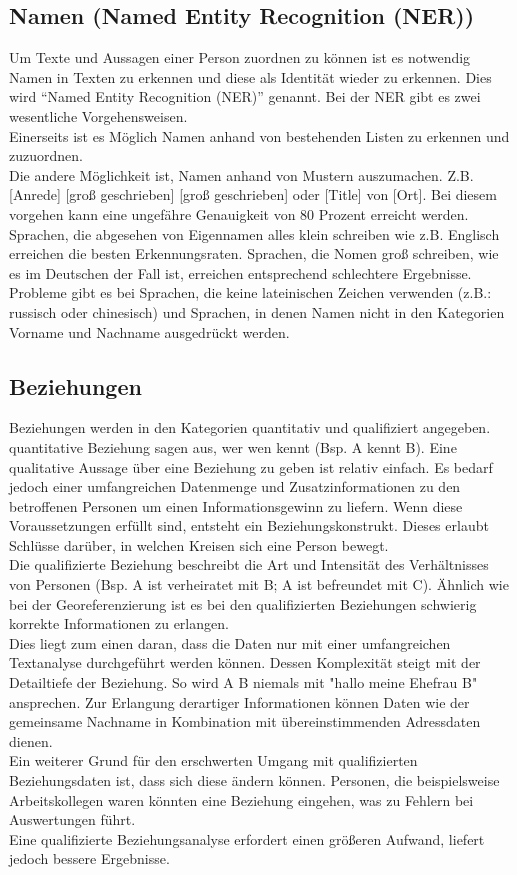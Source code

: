 \documentclass[twoside,a4paper]{article}
\begin{document}
\subsection{Namen (Named Entity Recognition (NER))}
Um Texte und Aussagen einer Person zuordnen zu können ist es notwendig Namen in Texten zu erkennen und diese als Identität wieder zu erkennen. Dies wird \enquote{Named Entity Recognition (NER)} genannt. Bei der NER gibt es zwei wesentliche Vorgehensweisen. \\
Einerseits ist es Möglich Namen anhand von bestehenden Listen zu erkennen und zuzuordnen.\\
Die andere Möglichkeit ist, Namen anhand von Mustern auszumachen. Z.B. [Anrede] [groß geschrieben] [groß geschrieben] oder [Title] von [Ort]. Bei diesem vorgehen kann eine ungefähre Genauigkeit von 80 Prozent\cite{challanges_in_osint} erreicht werden. Sprachen, die abgesehen von Eigennamen alles klein schreiben wie z.B. Englisch erreichen die besten Erkennungsraten. Sprachen, die Nomen groß schreiben, wie es im Deutschen der Fall ist, erreichen entsprechend schlechtere Ergebnisse. Probleme gibt es bei Sprachen, die keine lateinischen Zeichen verwenden (z.B.: russisch oder chinesisch) und Sprachen, in denen Namen nicht in den Kategorien Vorname und Nachname ausgedrückt werden.

\subsection{Beziehungen}
Beziehungen werden in den Kategorien quantitativ und qualifiziert angegeben.\\
quantitative Beziehung sagen aus, wer wen kennt (Bsp. A kennt B). Eine qualitative Aussage über eine Beziehung zu geben ist relativ einfach. Es bedarf jedoch einer umfangreichen Datenmenge und Zusatzinformationen zu den betroffenen Personen um einen Informationsgewinn zu liefern. Wenn diese Voraussetzungen erfüllt sind, entsteht ein Beziehungskonstrukt. Dieses erlaubt Schlüsse darüber, in welchen Kreisen sich eine Person bewegt.\\
Die qualifizierte Beziehung beschreibt die Art und Intensität des Verhältnisses von Personen (Bsp. A ist verheiratet mit B; A ist befreundet mit C). Ähnlich wie bei der Georeferenzierung ist es bei den qualifizierten Beziehungen schwierig korrekte Informationen zu erlangen. \\
Dies liegt zum einen daran, dass die Daten nur mit einer umfangreichen Textanalyse durchgeführt werden können. Dessen Komplexität steigt mit der Detailtiefe der Beziehung. So wird A B niemals mit "hallo meine Ehefrau B" ansprechen. Zur Erlangung derartiger Informationen können Daten wie der gemeinsame Nachname in Kombination mit übereinstimmenden Adressdaten dienen.\\
Ein weiterer Grund für den erschwerten Umgang mit qualifizierten Beziehungsdaten ist, dass sich diese ändern können. Personen, die beispielsweise Arbeitskollegen waren könnten eine Beziehung eingehen, was zu Fehlern bei Auswertungen führt.\\
Eine qualifizierte Beziehungsanalyse erfordert einen größeren Aufwand, liefert jedoch bessere Ergebnisse.
\end{document}
